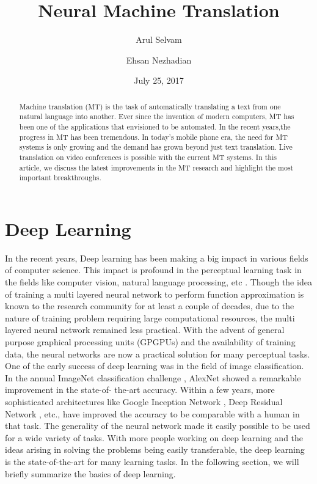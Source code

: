 \documentclass[a4paper]{article}
\begin{document}
\title{Neural Machine Translation}
\author{Arul Selvam}
\author{Ehsan Nezhadian}
\date{July 25, 2017}
\maketitle


\begin{abstract}
Machine translation (MT) is the task of automatically  translating  a  text from
one natural language into another. Ever since the invention of modern computers,
MT  has been  one of the  applications that envisioned  to be automated. In  the
recent years,the  progress in  MT has been  tremendous. In  today's mobile phone
era,  the need for MT systems is only  growing and  the demand  has grown beyond
just text  translation.  Live translation on video conferences  is possible with
the current MT systems. In this article, we discuss the  latest improvements  in
the MT research and highlight the most important breakthroughs.
\end{abstract}


\section{Deep Learning}

In  the  recent  years, Deep learning  has been  making  a big impact in various
fields of computer science. This impact is profound  in the  perceptual learning
task  in  the fields  like  computer  vision, natural  language  processing, etc
\cite{lecun2015deep}. Though the idea of training a multi layered neural network
to  perform function approximation is known to  the  research community  for  at
least  a  couple of  decades\cite{schmidhuber2015deep}, due  to  the  nature  of
training problem  requiring  large computational  resources,  the  multi layered
neural  network  remained less  practical. With  the advent  of general  purpose
graphical processing units (GPGPUs) and the  availability of training data,  the
neural networks are now a practical solution for many perceptual tasks.  One  of
the early success  of deep learning was in the field of image classification. In
the  annual ImageNet classification  challenge \cite{deng2009imagenet},  AlexNet
\cite{krizhevsky2012imagenet} showed a  remarkable improvement  in the state-of-
the-art accuracy. Within  a  few years,  more  sophisticated architectures  like
Google Inception  Network \cite{szegedy2016rethinking},  Deep  Residual  Network
\cite{he2016deep}, etc.,  have  improved the  accuracy  to be  comparable with a
human in that task. The generality of the neural network made it easily possible
to  be used  for  a wide  variety  of tasks.  With  more people working  on deep
learning  and  the   ideas  arising   in  solving   the  problems  being  easily
transferable, the deep learning is the state-of-the-art for many learning tasks.
In the following section, we will briefly summarize the basics of deep learning.
\end{document}
